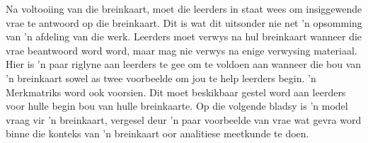 Na voltooiing van die breinkaart, moet die leerders in staat wees om
insiggewende vrae te antwoord op die breinkaart. Dit is wat dit uitsonder
nie net 'n opsomming van 'n afdeling van die werk. Leerders moet
verwys na hul breinkaart wanneer die vrae beantwoord word word, maar mag
nie verwys na enige verwysing materiaal. Hier is 'n paar riglyne aan
leerders te gee om te voldoen aan wanneer die bou van 'n breinkaart
sowel as twee voorbeelde om jou te help leerders begin. 'n Merkmatriks
word ook voorsien. Dit moet beskikbaar gestel word aan leerders voor
hulle begin bou van hulle breinkaarte. Op die volgende bladsy is 'n
model vraag vir 'n breinkaart, vergesel deur 'n paar voorbeelde van
vrae wat gevra word binne die konteks van 'n breinkaart oor analitiese
meetkunde te doen.


